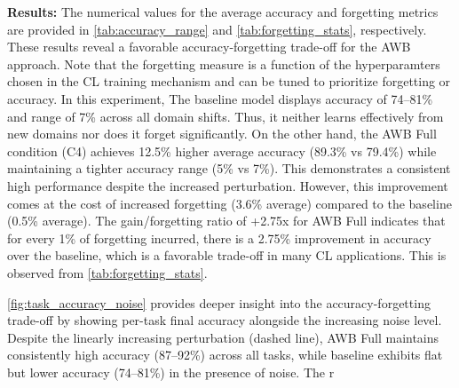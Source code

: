 \textbf{Results:} The numerical values for the average accuracy and forgetting metrics are provided in \cref{tab:accuracy_range} and \cref{tab:forgetting_stats}, respectively. These results reveal a favorable accuracy-forgetting trade-off for the AWB approach. Note that the forgetting measure is a function of the hyperparamters chosen in the CL training mechanism and can be tuned to prioritize forgetting or accuracy. In this experiment, The baseline model displays accuracy of 74--81\% and range of 7\% across all domain shifts. Thus, it neither learns effectively from new domains nor does it forget significantly. On the other hand, the AWB Full condition (C4) achieves 12.5\% higher average accuracy (89.3\% vs 79.4\%) while maintaining a tighter accuracy range (5\% vs 7\%). This demonstrates a consistent high performance despite the increased perturbation. However, this improvement comes at the cost of increased forgetting (3.6\% average) compared to the baseline (0.5\% average). The gain/forgetting ratio of +2.75x for AWB Full indicates that for every 1\% of forgetting incurred, there is a 2.75\% improvement in accuracy over the baseline, which is a favorable trade-off in many CL applications. This is observed from \cref{tab:forgetting_stats}.

\cref{fig:task_accuracy_noise} provides deeper insight into the accuracy-forgetting trade-off by showing per-task final accuracy alongside the increasing noise level. Despite the linearly increasing perturbation (dashed line), AWB Full maintains consistently high accuracy (87--92\%) across all tasks, while baseline exhibits flat but lower accuracy (74--81\%) in the presence of noise. The r






